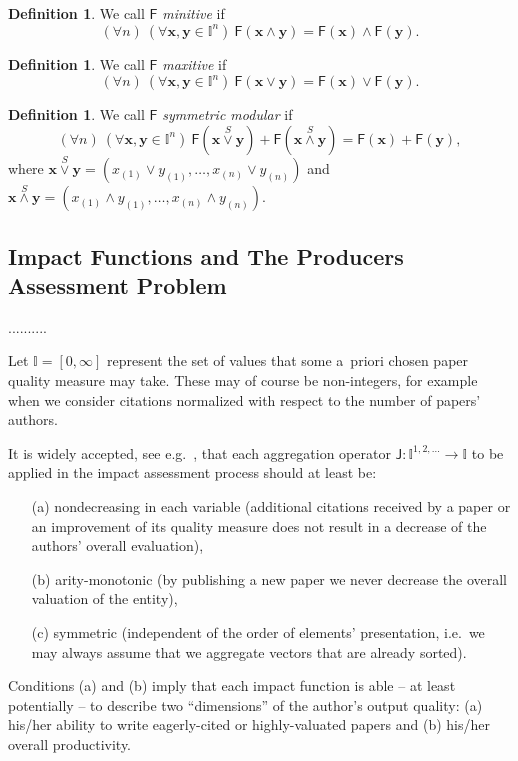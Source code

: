 \documentclass[11pt]{article}\usepackage{graphicx, color}
\renewcommand{\emph}[1]{\textsl{#1}}
\newcommand{\vect}[1]{{\mathbf{#1}}}
\newcommand{\func}[1]{{\mathsf{#1}}}
\newcommand{\Ival}{\mathbb{I}}
\newcommand{\IvalPow}[1]{\mathbb{I}^{#1}}
\newcommand{\AnyPow}{^{1,2,\dots}}
\newcommand{\IvalAnyPow}{\mathbb{I}\AnyPow}
\theoremstyle{remark}
\theoremstyle{definition}
\newtheorem{definition}[theorem]{Definition}
\begin{document}
\begin{definition}
We call $\func{F}$ \emph{minitive} if \[(\forall n)\ (\forall \vect{x},\vect{y}\in\IvalPow{n})\ 
\func{F}(\vect{x}\wedge
\vect{y})=\func{F}(\vect{x})\wedge\func{F}(\vect{y}).\]

\end{definition}

\begin{definition}
We call $\func{F}$ \emph{maxitive} if \[(\forall n)\ (\forall \vect{x},\vect{y}\in\IvalPow{n})\
\func{F}(\vect{x}\vee
\vect{y})=\func{F}(\vect{x})\vee\func{F}(\vect{y}).\] 
\end{definition}

\begin{definition}
We call $\func{F}$ \emph{symmetric modular} if \[(\forall n)\ (\forall \vect{x},\vect{y}\in\IvalPow{n})\ 
\func{F}(\vect{x}\stackrel{S}{\vee}\vect{y})
+\func{F}(\vect{x}\stackrel{S}{\wedge}\vect{y})=\func{F}(\vect{x})+\func{F}
(\vect{y}),\] 
where $\vect{x}\stackrel{S}{\vee  }\vect{y}=(x_{(1)}\vee
y_{(1)},\dots,x_{(n)}\vee   y_{(n)})$
and
$\vect{x}\stackrel{S}{\wedge}\vect{y}=(x_{(1)}\wedge y_{(1)},\dots,x_{(n)}\wedge
y_{(n)})$.
\end{definition}

\subsection{Impact Functions and The Producers Assessment Problem}

..........

Let $\Ival=[0,\infty]$ represent the set of values that some a~priori chosen
paper quality measure may take. These may of course be non-integers,
for example when we consider citations normalized with respect
to the number of papers' authors.


It is widely accepted, see e.g.~\cite{Woeginger2008:axiomatich,
Woeginger2008:axiomaticg,
Woeginger2008:symmetryaxiom,Rousseau2008:woegingerax,Quesada2009:monotonicityh,
Quesada2010:moreaxiomatics,GagolewskiGrzegorzewski2011:ijar,
Gagolewski2011:PhD,FranceschiniMaisano2011:structevalh},
that each aggregation operator
 $\func{J}:\IvalAnyPow\to\Ival$ to be applied in the impact assessment
 process  should at least be:
\begin{enumerate}
   \item[(a)] nondecreasing in each variable (additional
   citations received by a paper or an improvement
   of its quality measure does not result
   in a decrease of the authors' overall evaluation),
   \item[(b)] arity-monotonic (by publishing a new paper we
   never decrease the overall valuation of the entity),
   \item[(c)] symmetric (independent
of the order of elements' presentation, i.e.~we may always assume that
we aggregate vectors that are already sorted).
\end{enumerate}
Conditions (a) and (b) imply that each impact function
is able -- at least potentially -- to describe two ``dimensions''
of the author's output quality: (a) his/her ability to write
eagerly-cited or highly-valuated papers and (b) his/her overall productivity.
\end{document}
